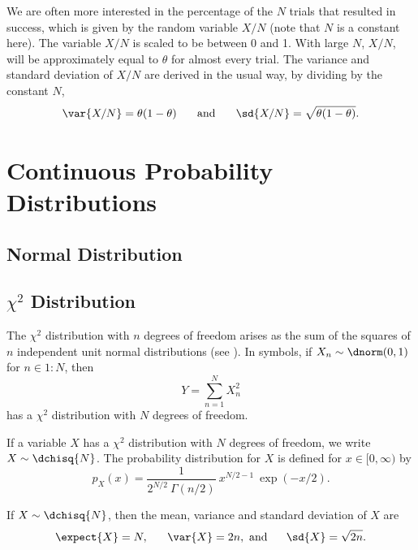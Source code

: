We are often more interested in the percentage of the $N$ trials that
resulted in success, which is given by the random variable $X/N$ (note
that $N$ is a constant here).  The variable $X/N$ is scaled to be
between 0 and 1.  With large $N$, $X/N$, will be approximately equal
to $\theta$ for almost every trial.  The variance and standard
deviation of $X/N$ are derived in the usual way, by dividing by the
constant $N$,
%
\begin{equation}
\var{X/N} = \theta (1 - \theta) 
\hspace*{0.25in}
\mbox{and}
\hspace*{0.25in}
\sd{X/N} = \sqrt{\theta (1-\theta)}.
\end{equation}



\section{Continuous Probability Distributions}

\subsection{Normal Distribution}\label{section:stats-normal-distribution}



\subsection{$\chi^2$ Distribution}\label{section:stats-chi-squared-distribution}

The $\chi^2$ distribution with $n$ degrees of freedom arises as the
sum of the squares of $n$ independent unit normal distributions (see
).  In symbols, if $X_n \sim \dnorm(0,1)$
for $n \in 1{:}N$, then 
%
\begin{equation}
Y = \sum_{n=1}^N X_n^2
\end{equation}
%
has a $\chi^2$ distribution with $N$ degrees of freedom.

If a variable $X$ has a $\chi^2$ distribution with $N$ degrees of
freedom, we write $X \sim \dchisq{N}$.  The probability distribution
for $X$ is defined for $x \in [0,\infty)$ by
%
\begin{equation}
p_X(x) = \frac{1}{2^{N/2} \ \Gamma(n/2)} \ x^{N/2-1} \ \exp(-x/2).
\end{equation}
%

If $X \sim \dchisq{N}$, then the mean, variance and standard deviation of $X$ are
%
\begin{equation}
\expect{X} = N,
\ \ \ \ \ 
\var{X} = 2n, \mbox{ and}
\ \ \ \ \  
\sd{X} = \sqrt{2n}.
\end{equation}


